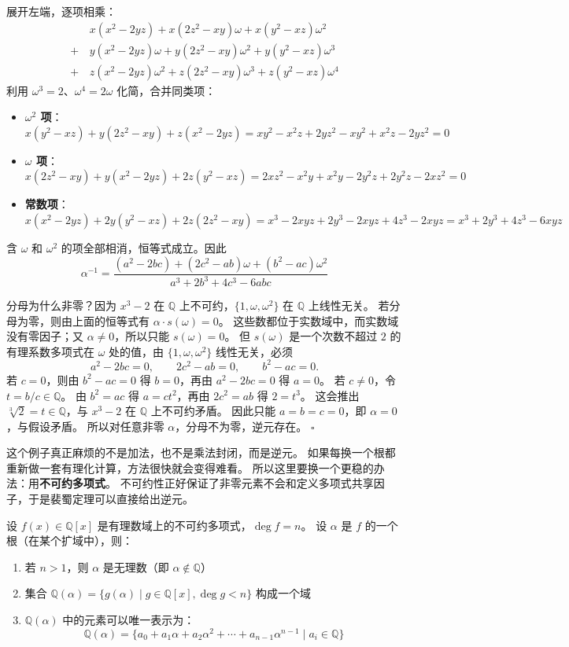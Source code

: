 展开左端，逐项相乘：
\begin{align*}
&x(x^2 - 2yz) + x(2z^2 - xy)\omega + x(y^2 - xz)\omega^2 \\
+\,&y(x^2 - 2yz)\omega + y(2z^2 - xy)\omega^2 + y(y^2 - xz)\omega^3 \\
+\,&z(x^2 - 2yz)\omega^2 + z(2z^2 - xy)\omega^3 + z(y^2 - xz)\omega^4
\end{align*}
利用 $\omega^3 = 2$、$\omega^4 = 2\omega$ 化简，合并同类项：
\begin{itemize}
    \item \textbf{$\omega^2$ 项}：$x(y^2 - xz) + y(2z^2 - xy) + z(x^2 - 2yz) = xy^2 - x^2z + 2yz^2 - xy^2 + x^2z - 2yz^2 = 0$
    \item \textbf{$\omega$ 项}：$x(2z^2 - xy) + y(x^2 - 2yz) + 2z(y^2 - xz) = 2xz^2 - x^2y + x^2y - 2y^2z + 2y^2z - 2xz^2 = 0$
    \item \textbf{常数项}：$x(x^2 - 2yz) + 2y(y^2 - xz) + 2z(2z^2 - xy) = x^3 - 2xyz + 2y^3 - 2xyz + 4z^3 - 2xyz = x^3 + 2y^3 + 4z^3 - 6xyz$
\end{itemize}
含 $\omega$ 和 $\omega^2$ 的项全部相消，恒等式成立。因此
\[\alpha^{-1} = \frac{(a^2 - 2bc) + (2c^2 - ab)\omega + (b^2 - ac)\omega^2}{a^3 + 2b^3 + 4c^3 - 6abc}\]

分母为什么非零？因为 $x^3 - 2$ 在 $\mathbb{Q}$ 上不可约，$\{1, \omega, \omega^2\}$ 在 $\mathbb{Q}$ 上线性无关。
若分母为零，则由上面的恒等式有 $\alpha\cdot s(\omega)=0$。
这些数都位于实数域中，而实数域没有零因子；又 $\alpha\neq0$，所以只能 $s(\omega)=0$。
但 $s(\omega)$ 是一个次数不超过 $2$ 的有理系数多项式在 $\omega$ 处的值，由 $\{1,\omega,\omega^2\}$ 线性无关，必须
\[
a^2-2bc=0,\qquad 2c^2-ab=0,\qquad b^2-ac=0.
\]
若 $c=0$，则由 $b^2-ac=0$ 得 $b=0$，再由 $a^2-2bc=0$ 得 $a=0$。
若 $c\neq0$，令 $t=b/c\in\mathbb{Q}$。
由 $b^2=ac$ 得 $a=ct^2$，再由 $2c^2=ab$ 得 $2=t^3$。
这会推出 $\sqrt[3]{2}=t\in\mathbb{Q}$，与 $x^3-2$ 在 $\mathbb{Q}$ 上不可约矛盾。
因此只能 $a=b=c=0$，即 $\alpha=0$，与假设矛盾。
所以对任意非零 $\alpha$，分母不为零，逆元存在。 $\square$

这个例子真正麻烦的不是加法，也不是乘法封闭，而是逆元。
如果每换一个根都重新做一套有理化计算，方法很快就会变得难看。
所以这里要换一个更稳的办法：用\textbf{不可约多项式}。
不可约性正好保证了非零元素不会和定义多项式共享因子，于是裴蜀定理可以直接给出逆元。

\begin{theorem}[域的扩张构造]\label{thm:field-extension}
设 $f(x) \in \mathbb{Q}[x]$ 是有理数域上的不可约多项式，$\deg f = n$。
设 $\alpha$ 是 $f$ 的一个根（在某个扩域中），则：
\begin{enumerate}
    \item 若 $n > 1$，则 $\alpha$ 是无理数（即 $\alpha \notin \mathbb{Q}$）
    \item 集合 $\mathbb{Q}(\alpha) = \{g(\alpha) \mid g \in \mathbb{Q}[x], \deg g < n\}$ 构成一个域
    \item $\mathbb{Q}(\alpha)$ 中的元素可以唯一表示为：
    \[\mathbb{Q}(\alpha) = \{a_0 + a_1\alpha + a_2\alpha^2 + \cdots + a_{n-1}\alpha^{n-1} \mid a_i \in \mathbb{Q}\}\]
\end{enumerate}
\end{theorem}

